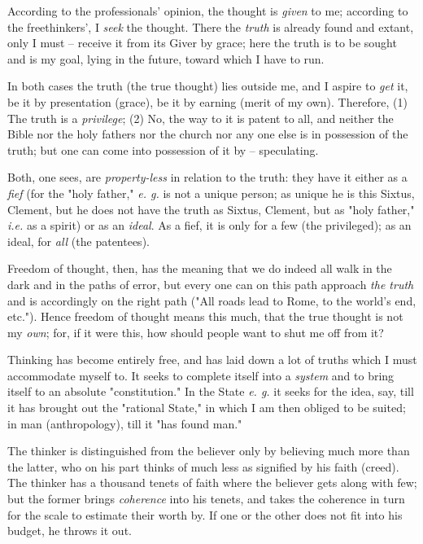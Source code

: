 According to the professionals' opinion, the thought is \textit{given} to me; 
according to the freethinkers', I \textit{seek} the thought. There the 
\textit{truth} is already found and extant, only I must -- receive it from its 
Giver by grace; here the truth is to be sought and is my goal, lying in the 
future, toward which I have to run.

In both cases the truth (the true thought) lies outside me, and I aspire to 
\textit{get} it, be it by presentation (grace), be it by earning (merit of my 
own). Therefore, (1) The truth is a \textit{privilege}; (2) No, the way to it 
is patent to all, and neither the Bible nor the holy fathers nor the church 
nor any one else is in possession of the truth; but one can come into 
possession of it by -- speculating.

Both, one sees, are \textit{property-less} in relation to the truth: they have 
it either as a \textit{fief} (for the "{}holy father,"{} \textit{e. g.} is not 
a unique person; as unique he is this Sixtus, Clement, but he does not have 
the truth as Sixtus, Clement, but as "{}holy father,"{} \textit{i.e.} as a 
spirit) or as an \textit{ideal}. As a fief, it is only for a few (the 
privileged); as an ideal, for \textit{all} (the patentees).

Freedom of thought, then, has the meaning that we do indeed all walk in the 
dark and in the paths of error, but every one can on this path approach 
\textit{the truth} and is accordingly on the right path ("{}All roads lead to 
Rome, to the world's end, etc."{}). Hence freedom of thought means this much, 
that the true thought is not my \textit{own}; for, if it were this, how should 
people want to shut me off from it?

Thinking has become entirely free, and has laid down a lot of truths which I 
must accommodate myself to. It seeks to complete itself into a \textit{system} 
and to bring itself to an absolute "{}constitution."{} In the State \textit{e. 
g.} it seeks for the idea, say, till it has brought out the "{}rational 
State,"{} in which I am then obliged to be suited; in man (anthropology), till 
it "{}has found man."{}

The thinker is distinguished from the believer only by believing much more 
than the latter, who on his part thinks of much less as signified by his faith 
(creed). The thinker has a thousand tenets of faith where the believer gets 
along with few; but the former brings \textit{coherence} into his tenets, and 
takes the coherence in turn for the scale to estimate their worth by. If one 
or the other does not fit into his budget, he throws it out.

